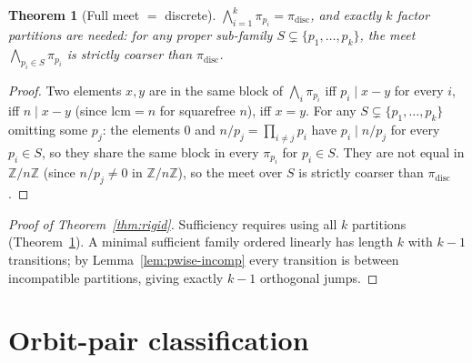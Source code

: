 \documentclass[11pt,reqno]{amsart}
\theoremstyle{plain}
\newtheorem{theorem}{Theorem}
\theoremstyle{definition}
\newcommand{\Z}{\mathbb{Z}}
\newcommand{\Zn}{\Z/n\Z}
\newcommand{\disc}{\mathrm{disc}}
\newcommand{\lcm}{\mathrm{lcm}}
\begin{document}
\begin{theorem}[Full meet $=$ discrete] \label{thm:full-meet}
$\bigwedge_{i=1}^{k} \pi_{p_i} = \pi_{\disc}$, and exactly $k$ factor partitions are needed: for any proper sub-family $S \subsetneq \{p_1,\ldots,p_k\}$, the meet $\bigwedge_{p_i \in S} \pi_{p_i}$ is strictly coarser than $\pi_{\disc}$.
\end{theorem}

\begin{proof}
Two elements $x, y$ are in the same block of $\bigwedge_i \pi_{p_i}$ iff $p_i \mid x - y$ for every $i$, iff $n \mid x - y$ (since $\lcm = n$ for squarefree $n$), iff $x = y$. For any $S \subsetneq \{p_1, \ldots, p_k\}$ omitting some $p_j$: the elements $0$ and $n/p_j = \prod_{i \neq j} p_i$ have $p_i \mid n/p_j$ for every $p_i \in S$, so they share the same block in every $\pi_{p_i}$ for $p_i \in S$. They are not equal in $\Zn$ (since $n/p_j \neq 0$ in $\Zn$), so the meet over $S$ is strictly coarser than $\pi_{\disc}$.
\end{proof}

\begin{proof}[Proof of Theorem~\ref{thm:rigid}]
Sufficiency requires using all $k$ partitions (Theorem~\ref{thm:full-meet}). A minimal sufficient family ordered linearly has length $k$ with $k - 1$ transitions; by Lemma~\ref{lem:pwise-incomp} every transition is between incompatible partitions, giving exactly $k - 1$ orthogonal jumps.
\end{proof}

\section{Orbit-pair classification}
\end{document}
